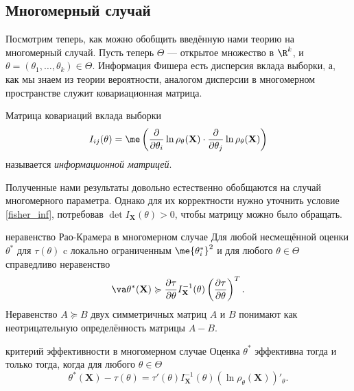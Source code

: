 \subsection{Многомерный случай}

Посмотрим теперь, как можно обобщить введённую нами теорию на многомерный случай. Пусть теперь $\Theta$ --- открытое множество в $\R^k$, и $\theta = (\theta_1, \ldots, \theta_k) \in \Theta$. Информация Фишера есть дисперсия вклада выборки, а, как мы знаем из теории вероятности, аналогом дисперсии в многомерном пространстве служит ковариационная матрица.

\begin{definition}
    Матрица ковариаций вклада выборки
    \[
    I_{ij}(\theta) = \me \left( \frac{\partial}{\partial \theta_i} \ln\rho_{\theta}(\mathbf X) \cdot \frac{\partial}{\partial \theta_j} \ln\rho_{\theta}(\mathbf X) \right)
    \]
    называется \textit{информационной матрицей}.
\end{definition}

Полученные нами результаты довольно естественно обобщаются на случай многомерного параметра. Однако для их корректности нужно уточнить условие \ref{fisher_inf}, потребовав $\det{I_{\mathbf X}(\theta)} > 0$, чтобы матрицу можно было обращать.

\begin{theorem}{неравенство Рао-Крамера в многомерном случае}{}
    Для любой несмещённой оценки $\theta^*$ для $\tau(\theta)$ c локально ограниченным $\me {\theta^*_i}^2$ и для любого $\theta \in \Theta$ справедливо неравенство
    \[
     \va\theta^*(\mathbf X) \succcurlyeq \frac{\partial \tau}{\partial \theta} I^{-1}_{\mathbf X}(\theta) \left(\frac{\partial \tau}{\partial \theta}\right)^T.
    \]
    Неравенство $A \succcurlyeq B$ двух симметричных матриц $A$ и $B$ понимают как неотрицательную определённость матрицы $A - B$.
\end{theorem}

\begin{theorem}{критерий эффективности в многомерном случае}{}
    Оценка $\theta^*$ эффективна тогда и только тогда, когда для любого $\theta \in \Theta$
    \[
    \theta^*(\mathbf X) - \tau(\theta) = \tau'(\theta) I^{-1}_{\mathbf X}(\theta) (\ln{\rho_{\theta}(\mathbf X)})'_{\theta}.
    \]
\end{theorem}

